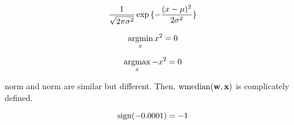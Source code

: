 \documentclass[]{article}
\begin{document}
\begin{eqnarray}
\frac{1}{\sqrt{2\pi {\sigma}^2}} \exp{ \{ -\frac{ (x - \mu)^2 }{ 2 \sigma^2 } \} }
\end{eqnarray}

\begin{eqnarray}
\mathop{\rm argmin}\limits_{x} x^2 = 0
\end{eqnarray}

\begin{eqnarray}
\mathop{\rm argmax}\limits_{x} -x^2 = 0
\end{eqnarray}

\lone norm and \ltwo norm are similar  but different.
Then, ${\rm wmedian}(\textbf{w}, \textbf{x})$ is complicately defined.

\begin{equation}
{\rm sign}(-0.0001) = -1 
\end{equation}
\end{document}

